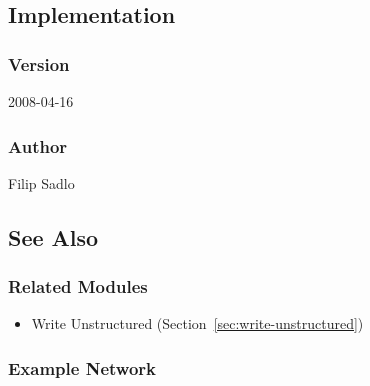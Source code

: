 \subsection{Implementation}


\subsubsection{Version}

2008-04-16


\subsubsection{Author}

Filip Sadlo


\subsection{See Also}


\subsubsection{Related Modules}

\begin{itemize}

\item
  Write Unstructured (Section~\ref{sec:write-unstructured})

\end{itemize}


\subsubsection{Example Network}

